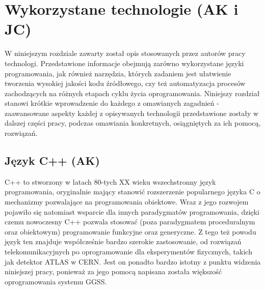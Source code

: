 \chapter{Wykorzystane technologie (AK i JC)}
\label{ch:technologies}

\graphicspath{{2_technologies/figures/}}

W niniejszym rozdziale zawarty został opis stosowanych przez autorów pracy technologi. Przedstawione informacje obejmują zarówno wykorzystane języki programowania, jak również narzędzia, których zadaniem jest ułatwienie tworzenia wysokiej jakości kodu źródłowego, czy też automatyzacja procesów zachodzących na różnych etapach cyklu życia oprogramowania. Niniejszy rozdział stanowi krótkie wprowadzenie do każdego z omawianych zagadnień - zaawansowane aspekty każdej z opisywanych technologii przedstawione zostały w dalszej części pracy, podczas omawiania konkretnych, osiągniętych za ich pomocą, rozwiązań. 


\section{Język C++ (AK)}
C++ to stworzony w latach 80-tych XX wieku wszechstronny język programowania, oryginalnie mający stanowić rozszerzenie popularnego języka C o mechanizmy pozwalające na programowania obiektowe. Wraz z jego rozwojem pojawiło się natomiast wsparcie dla innych paradygmatów programowania, dzięki czemu nowoczesny C++ pozwala stosować (poza paradygmatem proceduralnym oraz obiektowym) programowanie funkcyjne oraz generyczne. Z tego też powodu język ten znajduje współcześnie bardzo szerokie zastosowanie, od rozwiązań telekomunikacyjnych po oprogramowanie dla eksperymentów fizycznych, takich jak detektor ATLAS w CERN. Jest on ponadto bardzo istotny z punktu widzenia niniejszej pracy, ponieważ za jego pomocą napisana została większość oprogramowania systemu GGSS.

